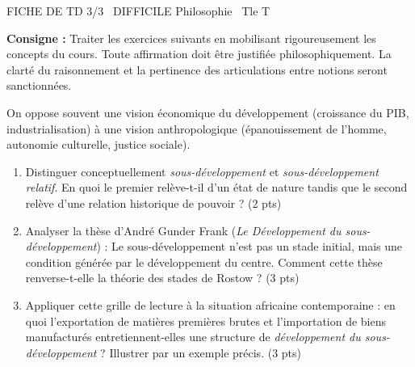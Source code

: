 \documentclass[11pt]{article}
\begin{document}
\begin{tcolorbox}[enhanced,colback=popink,colframe=popink,arc=10pt,boxrule=0pt,left=12pt,right=12pt,top=9pt,bottom=9pt]
{\color{white}\popxbold\small FICHE DE TD 3/3 \textbullet\ DIFFICILE \hfill Philosophie \textbullet\ Tle T\par}
\end{tcolorbox}
\vspace{4pt}
\noindent\textbf{Consigne :} Traiter les exercices suivants en mobilisant rigoureusement les concepts du cours. Toute affirmation doit être justifiée philosophiquement. La clarté du raisonnement et la pertinence des articulations entre notions seront sanctionnées.

\begin{exercice}
On oppose souvent une vision \og économique\fg{} du développement (croissance du PIB, industrialisation) à une vision \og anthropologique\fg{} (épanouissement de l'homme, autonomie culturelle, justice sociale). 
\begin{enumerate}
    \item Distinguer conceptuellement \textit{sous-développement} et \textit{sous-développement relatif}. En quoi le premier relève-t-il d'un état de nature tandis que le second relève d'une relation historique de pouvoir ? (2 pts)
    \item Analyser la thèse d'André Gunder Frank (\textit{Le Développement du sous-développement}) : \og Le sous-développement n'est pas un stade initial, mais une condition générée par le développement du centre\fg. Comment cette thèse renverse-t-elle la théorie des stades de Rostow ? (3 pts)
    \item Appliquer cette grille de lecture à la situation africaine contemporaine : en quoi l'exportation de matières premières brutes et l'importation de biens manufacturés entretiennent-elles une structure de \textit{développement du sous-développement} ? Illustrer par un exemple précis. (3 pts)
\end{enumerate}
\end{exercice}
\end{document}
